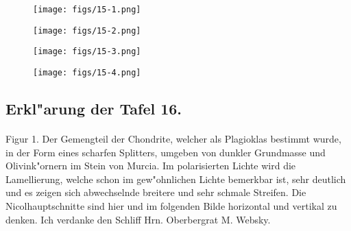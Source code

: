 \documentclass[a4paper, 11pt, oneside, polutonikogreek, german]{article}
\begin{document}
\vspace*{\fill}
\begin{figure}[H]
\centering
\texttt{[image: figs/15-1.png]}
\caption{}
\end{figure}
\vspace*{\fill}
\clearpage

\vspace*{\fill}
\begin{figure}[H]
\centering
\texttt{[image: figs/15-2.png]}
\caption{}
\end{figure}
\vspace*{\fill}
\clearpage

\vspace*{\fill}
\begin{figure}[H]
\centering
\texttt{[image: figs/15-3.png]}
\caption{}
\end{figure}
\vspace*{\fill}
\clearpage

\vspace*{\fill}
\begin{figure}[H]
\centering
\texttt{[image: figs/15-4.png]}
\caption{}
\end{figure}
\vspace*{\fill}
\clearpage

\subsection{Erkl"arung der Tafel 16.}
\paragraph{}
Figur 1. Der Gemengteil der Chondrite, welcher als Plagioklas bestimmt wurde, in der Form eines scharfen Splitters, umgeben von dunkler Grundmasse und Olivink"ornern im Stein von Murcia. Im polarisierten Lichte wird die Lamellierung, welche schon im gew"ohnlichen Lichte bemerkbar ist, sehr deutlich und es zeigen sich abwechselnde breitere und sehr schmale Streifen. Die Nicolhauptschnitte sind hier und im folgenden Bilde horizontal und vertikal zu denken. Ich verdanke den Schliff Hrn. Oberbergrat M. Websky.
\end{document}
